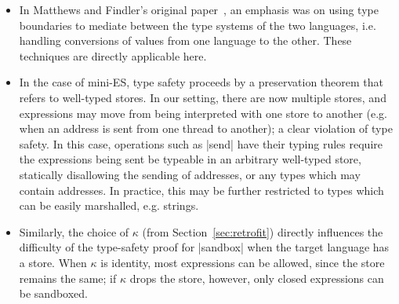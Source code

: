 \begin{itemize}
    \item In Matthews and Findler's original
        paper~\cite{Matthews:2007:OSM:1190216.1190220}, an emphasis was
        on using type boundaries to mediate between the type systems of
        the two languages, i.e. handling conversions of values from
        one language to the other.  These techniques are directly applicable here.

    \item In the case of mini-ES, type safety proceeds by a preservation theorem
        that refers to well-typed stores.  In our setting, there are now multiple
        stores, and expressions may move from being interpreted with one store
        to another (e.g. when an address is sent from one thread to
        another); a clear violation of type safety.  In this case, operations
        such as |send| have their typing rules require
        the expressions being sent be typeable in an arbitrary well-typed store,
        statically disallowing the sending of addresses, or any types which
        may contain addresses.  In practice, this may be further restricted to
        types which can be easily marshalled, e.g. strings.

    \item Similarly, the choice of $\kappa$ (from Section~\ref{sec:retrofit}) directly
        influences the difficulty of the type-safety proof for
        |sandbox| when the target language has a store.  When
        $\kappa$ is identity, most expressions can be allowed, since the store
        remains the same; if $\kappa$ drops the store, however, only closed expressions
        can be sandboxed.
\end{itemize}

